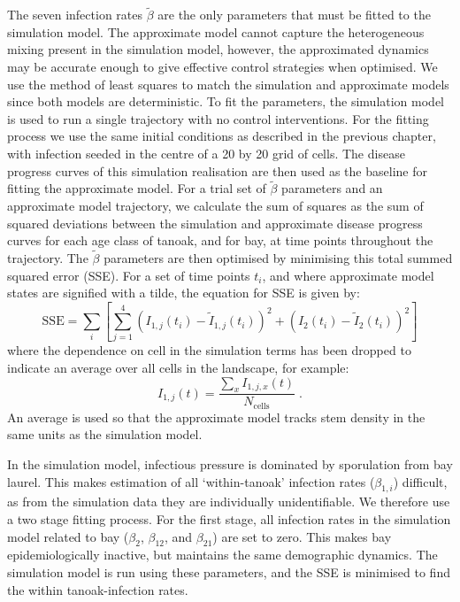The seven infection rates $\tilde{\beta}$ are the only parameters that must be fitted to the simulation model. The approximate model cannot capture the heterogeneous mixing present in the simulation model, however, the approximated dynamics may be accurate enough to give effective control strategies when optimised. We use the method of least squares to match the simulation and approximate models since both models are deterministic. To fit the parameters, the simulation model is used to run a single trajectory with no control interventions. For the fitting process we use the same initial conditions as described in the previous chapter, with infection seeded in the centre of a 20 by 20 grid of cells. The disease progress curves of this simulation realisation are then used as the baseline for fitting the approximate model. For a trial set of $\tilde{\beta}$ parameters and an approximate model trajectory, we calculate the sum of squares as the sum of squared deviations between the simulation and approximate disease progress curves for each age class of tanoak, and for bay, at time points throughout the trajectory. The $\tilde{\beta}$ parameters are then optimised by minimising this total summed squared error (SSE). For a set of time points $t_i$, and where approximate model states are signified with a tilde, the equation for SSE is given by:
\begin{equation}
    \mathrm{SSE} = \sum_{i}\left[\sum_{j=1}^4\left(I_{1,j}(t_i) - \tilde{I}_{1,j}(t_i)\right)^2 + \left(I_{2}(t_i) - \tilde{I}_{2}(t_i)\right)^2\right]
\end{equation}
where the dependence on cell in the simulation terms has been dropped to indicate an average over all cells in the landscape, for example:
\begin{equation}
    I_{1,j}(t) = \frac{\sum_xI_{1,j,x}(t)}{N_\textrm{cells}}\;.
\end{equation}
An average is used so that the approximate model tracks stem density in the same units as the simulation model.

In the simulation model, infectious pressure is dominated by sporulation from bay laurel. This makes estimation of all `within-tanoak' infection rates ($\beta_{1,i}$) difficult, as from the simulation data they are individually unidentifiable. We therefore use a two stage fitting process. For the first stage, all infection rates in the simulation model related to bay ($\beta_2$, $\beta_{12}$, and $\beta_{21}$) are set to zero. This makes bay epidemiologically inactive, but maintains the same demographic dynamics. The simulation model is run using these parameters, and the SSE is minimised to find the within tanoak-infection rates.

